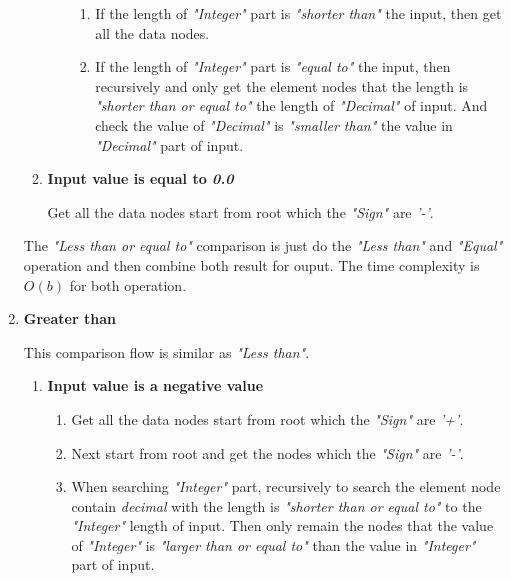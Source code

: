 \begin{enumerate}
\begin{enumerate}
\begin{enumerate}
\begin{enumerate}
\item If the length of \textit{"Integer"} part is \textit{"shorter than"} the input, then get all the data nodes.

\item If the length of \textit{"Integer"} part is \textit{"equal to"} the input, then recursively and only get the element nodes that the length is \textit{"shorter than or equal to"} the length of \textit{"Decimal"} of input. And check the value of \textit{"Decimal"} is \textit{"smaller than"} the value in \textit{"Decimal"} part of input.
\end{enumerate}

\end{enumerate}

\item \textbf{Input value is equal to \textit{0.0}}

Get all the data nodes start from root which the \textit{"Sign"} are \textit{'-'}.

\end{enumerate}

The \emph{"Less than or equal to"} comparison is just do the \emph{"Less than"} and \emph{"Equal"} operation and then combine both result for ouput. The time complexity is $O(b)$ for both operation.


\item \textbf{Greater than}

This comparison flow is similar as \emph{"Less than"}.

\begin{enumerate}

\item \textbf{Input value is a negative value}

\begin{enumerate}

\item Get all the data nodes start from root which the \textit{"Sign"} are \textit{'+'}.

\item Next start from root and get the nodes which the \textit{"Sign"} are \textit{'-'}.

\item When searching \textit{"Integer"} part, recursively to search the element node contain \textit{decimal} with the length is \textit{"shorter than or equal to"} to the \textit{"Integer"} length of input. Then only remain the nodes that the value of \textit{"Integer"} is \textit{"larger than or equal to"} than the value in \textit{"Integer"} part of input.


\end{enumerate}
\end{enumerate}
\end{enumerate}
